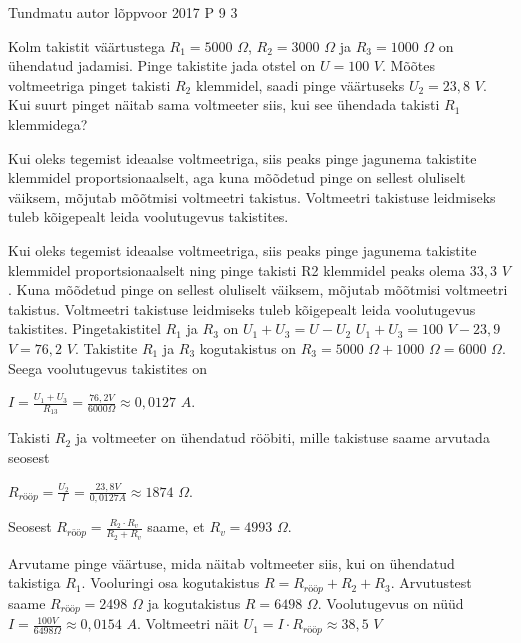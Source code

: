 {Tundmatu autor} %
{lõppvoor} %
{2017} %
{P 9} %
{3} %
{

\ifStatement
Kolm takistit väärtustega $R_1 = 5000$ $\Omega$, $R_2 = 3000$ $\Omega$ ja $R_3 = 1000$ $\Omega$ on ühendatud jadamisi. Pinge takistite jada otstel on $U = 100$ $V$. Mõõtes voltmeetriga pinget takisti $R_2$ klemmidel, saadi pinge väärtuseks $U_2 = 23,8$ $V$. Kui suurt pinget näitab sama voltmeeter siis, kui see ühendada takisti $R_1$ klemmidega?
\fi

\ifHint
Kui oleks tegemist ideaalse voltmeetriga, siis peaks pinge jagunema takistite klemmidel proportsionaalselt, aga kuna mõõdetud pinge on sellest oluliselt väiksem, mõjutab mõõtmisi voltmeetri takistus. Voltmeetri takistuse leidmiseks tuleb kõigepealt leida voolutugevus takistites.
\fi

\ifSolution
Kui oleks tegemist ideaalse voltmeetriga, siis peaks pinge jagunema takistite klemmidel proportsionaalselt ning pinge takisti R2 klemmidel peaks olema $33,3$ $V$. Kuna mõõdetud pinge on sellest oluliselt väiksem, mõjutab mõõtmisi voltmeetri takistus. Voltmeetri takistuse leidmiseks tuleb kõigepealt leida voolutugevus takistites.
Pingetakistitel $R_1$ ja $R_3$ on $U_1 + U_3 = U - U_2$
$U_1 + U_3 = 100$ $V - 23,9$ $V = 76,2$ $V$.
Takistite $R_1$ ja $R_3$ kogutakistus on $R_3 = 5000$ $\Omega + 1000$ $\Omega = 6000$ $\Omega$.
Seega voolutugevus takistites on
\begin{center}
$ I = \frac{U_1 + U_3}{R_13} = \frac{76,2 V}{6000 \Omega} \approx 0,0127$ $A$.
\end{center}
Takisti $R_2$ ja voltmeeter on ühendatud rööbiti, mille takistuse saame arvutada seosest
\begin{center}
$R_{rööp} = \frac{U_2}{I} = \frac{23,8 V}{0,0127 A} \approx 1874$ $\Omega$.
\end{center}
\begin{center}
Seosest $R_{rööp} = \frac{R_2 \cdot R_v}{R_2 + R_v}$ saame, et $R_v = 4993$ $\Omega$.
\end{center}
Arvutame pinge väärtuse, mida näitab voltmeeter siis, kui on ühendatud takistiga $R_1$.
Vooluringi osa kogutakistus $R = R_{rööp} + R_2 + R_3$.
Arvutustest saame $R_{rööp} = 2498$ $\Omega$ ja kogutakistus $R = 6498$ $\Omega$.
Voolutugevus on nüüd $I = \frac{100 V}{6498 \Omega} \approx 0,0154$ $A$.
Voltmeetri näit $U_1 = I \cdot R_{rööp} \approx 38,5$ $V$
\fi
}